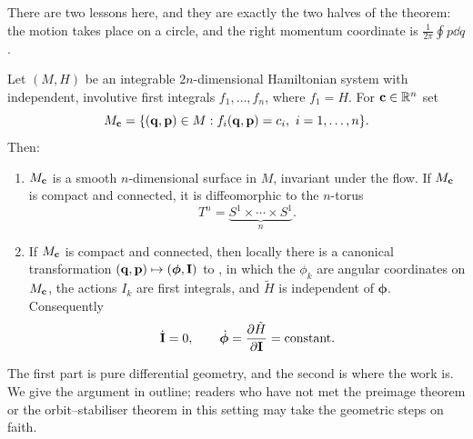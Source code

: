 \documentclass[a4paper]{scrartcl}
\begin{document}
There are two lessons here, and they are exactly the two halves of the theorem: the motion takes place on a circle, and the right momentum coordinate is $\frac{1}{2\pi}\oint p\dd q$.

\begin{theorem}
	Let $(M, H)$ be an integrable $2n$-dimensional Hamiltonian system with independent, involutive first integrals $f_1, \dots, f_n$, where $f_1 = H$. For $\mathbf{c} \in \mathbb{R}^n$ set
	$$
	M_{\mathbf{c}} = \{(\mathbf{q}, \mathbf{p})\in M : f_i(\mathbf{q}, \mathbf{p}) = c_i, \ i = 1,\dots, n\}.
	$$
	Then:
	\begin{enumerate}[label=(\roman*)]
		\item $M_{\mathbf{c}}$ is a smooth $n$-dimensional surface in $M$, invariant under the flow. If $M_{\mathbf{c}}$ is compact and connected, it is diffeomorphic to the $n$-torus
		$$
		T^n = \underbrace{S^1\times\cdots\times S^1}_{n}.
		$$
		\item If $M_{\mathbf{c}}$ is compact and connected, then locally there is a canonical transformation $(\mathbf{q}, \mathbf{p})\mapsto (\bm\phi, \mathbf{I})$ to , in which the $\phi_k$ are angular coordinates on $M_{\mathbf{c}}$, the actions $I_k$ are first integrals, and $\tilde H$ is independent of $\bm\phi$. Consequently
		$$
		\dot{\mathbf{I}} = 0, \qquad \dot{\bm\phi} = \frac{\partial \tilde H}{\partial \mathbf{I}} = \text{constant}.
		$$
	\end{enumerate}
\end{theorem}

The first part is pure differential geometry, and the second is where the work is. We give the argument in outline; readers who have not met the preimage theorem or the orbit--stabiliser theorem in this setting may take the geometric steps on faith.
\end{document}
